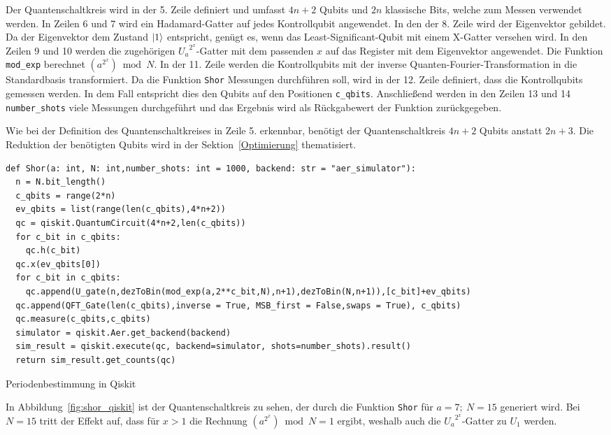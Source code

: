 Der Quantenschaltkreis wird in der 5. Zeile definiert und umfasst \(4n+2\) Qubits und 
\(2n\) klassische Bits, welche zum Messen verwendet werden.
In Zeilen 6 und 7 wird ein Hadamard-Gatter auf jedes Kontrollqubit angewendet.
In den der 8. Zeile wird der Eigenvektor gebildet. 
Da der Eigenvektor dem Zustand \(\ket{1}\) entspricht,
genügt es, wenn das Least-Significant-Qubit mit einem X-Gatter versehen wird.
In den Zeilen 9 und 10 werden die zugehörigen \({U_a}^{2^x}\)-Gatter mit dem passenden \(x\) auf das Register mit dem Eigenvektor angewendet.
Die Funktion \texttt{mod_exp} berechnet \((a^{2^x})\bmod N\).
In der 11. Zeile werden die Kontrollqubits mit der inverse Quanten-Fourier-Transformation in die Standardbasis transformiert.  
Da die Funktion \texttt{Shor} Messungen durchführen soll, 
wird in der 12. Zeile definiert, dass die Kontrollqubits gemessen werden.
In dem Fall entspricht dies den Qubits auf den Positionen \texttt{c_qbits}.
Anschließend werden in den Zeilen 13 und 14 \texttt{number_shots} viele Messungen durchgeführt und 
das Ergebnis wird als Rückgabewert der Funktion zurückgegeben.

Wie bei der Definition des Quantenschaltkreises in Zeile 5. erkennbar, 
benötigt der Quantenschaltkreis \(4n+2\) Qubits anstatt \(2n+3\).
Die Reduktion der benötigten Qubits wird in der Sektion~\ref{Optimierung} thematisiert. 

\begin{listing}[H]
\begin{verbatim}  
def Shor(a: int, N: int,number_shots: int = 1000, backend: str = "aer_simulator"):
  n = N.bit_length()
  c_qbits = range(2*n)
  ev_qbits = list(range(len(c_qbits),4*n+2))
  qc = qiskit.QuantumCircuit(4*n+2,len(c_qbits)) 
  for c_bit in c_qbits:
    qc.h(c_bit)
  qc.x(ev_qbits[0])
  for c_bit in c_qbits:
    qc.append(U_gate(n,dezToBin(mod_exp(a,2**c_bit,N),n+1),dezToBin(N,n+1)),[c_bit]+ev_qbits)
  qc.append(QFT_Gate(len(c_qbits),inverse = True, MSB_first = False,swaps = True), c_qbits)
  qc.measure(c_qbits,c_qbits)
  simulator = qiskit.Aer.get_backend(backend)
  sim_result = qiskit.execute(qc, backend=simulator, shots=number_shots).result()
  return sim_result.get_counts(qc)
  \end{verbatim}
  \caption{Periodenbestimmung in Qiskit}
  \label{code:Periodenbestimmung}
\end{listing}

In Abbildung~\ref{fig:shor_qiskit} ist der Quantenschaltkreis zu sehen, 
der durch die Funktion \texttt{Shor} für \(a=7;~N=15\) generiert wird.
Bei \(N=15\) tritt der Effekt auf, dass für \(x>1\) die Rechnung \((a^{2^x})\bmod N = 1\) ergibt, 
weshalb auch die \({U_a}^{2^x}\)-Gatter zu \(U_1\) werden.

